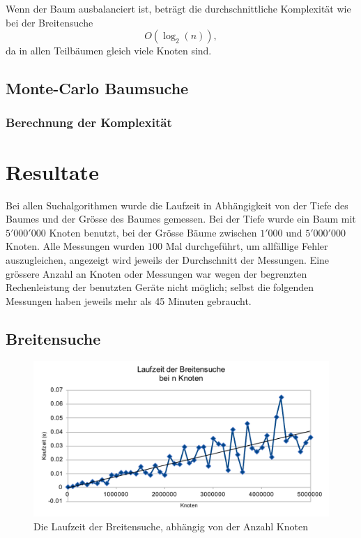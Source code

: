 \documentclass[a4paper,11pt]{article}
\begin{document}
Wenn der Baum ausbalanciert ist, beträgt die durchschnittliche Komplexität wie bei der Breitensuche $$O(\log_2(n)),$$ da in allen Teilbäumen gleich viele Knoten sind.

\subsection{Monte-Carlo Baumsuche}

\subsubsection{Berechnung der Komplexität}

\section{Resultate}
Bei allen Suchalgorithmen wurde die Laufzeit in Abhängigkeit von der Tiefe des Baumes und der Grösse des Baumes gemessen. Bei der Tiefe wurde ein Baum mit $5'000'000$ Knoten benutzt, bei der Grösse Bäume zwischen $1'000$ und $5'000'000$ Knoten. Alle Messungen wurden $100$ Mal durchgeführt, um allfällige Fehler auszugleichen, angezeigt wird jeweils der Durchschnitt der Messungen. Eine grössere Anzahl an Knoten oder Messungen war wegen der begrenzten Rechenleistung der benutzten Geräte nicht möglich; selbst die folgenden Messungen haben jeweils mehr als 45 Minuten gebraucht.

\subsection{Breitensuche}
	\begin{figure}[ht]
		\centering
		\includegraphics[width=0.85\linewidth]{img/BFS_size.pdf}
		\caption{Die Laufzeit der Breitensuche, abhängig von der Anzahl Knoten}
	\end{figure}
	
\end{document}
